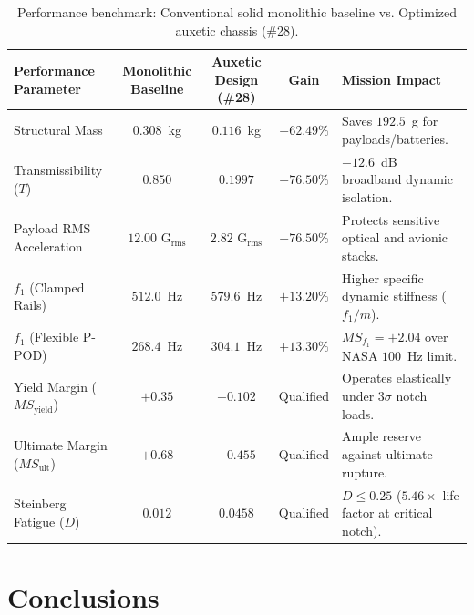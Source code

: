 \documentclass[preprint,12pt,3p]{elsarticle}
\begin{document}
\begin{table}[!htbp]
  \centering
  \caption{Performance benchmark: Conventional solid monolithic baseline vs. Optimized auxetic chassis (\#28).}
  \label{tab:benchmark}
  \scriptsize
  \begin{tabularx}{\textwidth}{l c c c X}
    \toprule
    \textbf{Performance Parameter} & \textbf{Monolithic Baseline} & \textbf{Auxetic Design (\#28)} & \textbf{Gain} & \textbf{Mission Impact} \\
    \midrule
    Structural Mass & $0.308$~kg & $0.116$~kg & $\mathbf{-62.49\%}$ & Saves $192.5$~g for payloads/batteries. \\
    Transmissibility ($T$) & $0.850$ & $0.1997$ & $\mathbf{-76.50\%}$ & $-12.6$~dB broadband dynamic isolation. \\
    Payload RMS Acceleration & $12.00\text{ G}_{\text{rms}}$ & $2.82\text{ G}_{\text{rms}}$ & $\mathbf{-76.50\%}$ & Protects sensitive optical and avionic stacks. \\
    $f_1$ (Clamped Rails) & $512.0$~Hz & $579.6$~Hz & $\mathbf{+13.20\%}$ & Higher specific dynamic stiffness ($f_1/m$). \\
    $f_1$ (Flexible P-POD) & $268.4$~Hz & $304.1$~Hz & $\mathbf{+13.30\%}$ & $MS_{f_1} = +2.04$ over NASA $100$~Hz limit. \\
    Yield Margin ($MS_{\text{yield}}$) & $+0.35$ & $+0.102$ & Qualified & Operates elastically under $3\sigma$ notch loads. \\
    Ultimate Margin ($MS_{\text{ult}}$) & $+0.68$ & $+0.455$ & Qualified & Ample reserve against ultimate rupture. \\
    Steinberg Fatigue ($D$) & $0.012$ & $0.0458$ & Qualified & $D \le 0.25$ ($5.46\times$ life factor at critical notch). \\
    \bottomrule
  \end{tabularx}
\end{table}

\section{Conclusions}
\label{sec:conclusions}
\end{document}
